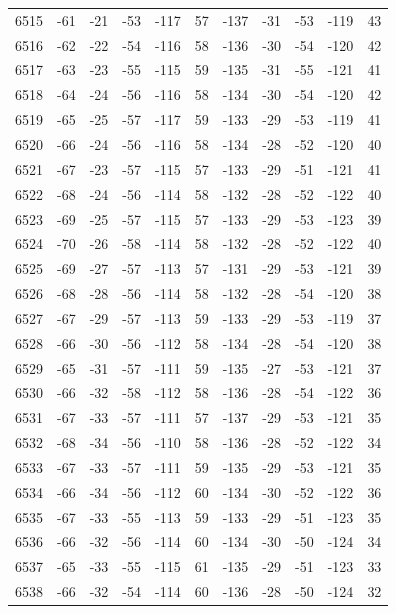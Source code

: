 \begin{table}[H]
\begin{tabular}{lllllllllll}
6515 & -61 & -21 & -53 & -117 & 57 & -137 & -31 & -53 & -119 & 43 \\
6516 & -62 & -22 & -54 & -116 & 58 & -136 & -30 & -54 & -120 & 42 \\
6517 & -63 & -23 & -55 & -115 & 59 & -135 & -31 & -55 & -121 & 41 \\
6518 & -64 & -24 & -56 & -116 & 58 & -134 & -30 & -54 & -120 & 42 \\
6519 & -65 & -25 & -57 & -117 & 59 & -133 & -29 & -53 & -119 & 41 \\
6520 & -66 & -24 & -56 & -116 & 58 & -134 & -28 & -52 & -120 & 40 \\
6521 & -67 & -23 & -57 & -115 & 57 & -133 & -29 & -51 & -121 & 41 \\
6522 & -68 & -24 & -56 & -114 & 58 & -132 & -28 & -52 & -122 & 40 \\
6523 & -69 & -25 & -57 & -115 & 57 & -133 & -29 & -53 & -123 & 39 \\
6524 & -70 & -26 & -58 & -114 & 58 & -132 & -28 & -52 & -122 & 40 \\
6525 & -69 & -27 & -57 & -113 & 57 & -131 & -29 & -53 & -121 & 39 \\
6526 & -68 & -28 & -56 & -114 & 58 & -132 & -28 & -54 & -120 & 38 \\
6527 & -67 & -29 & -57 & -113 & 59 & -133 & -29 & -53 & -119 & 37 \\
6528 & -66 & -30 & -56 & -112 & 58 & -134 & -28 & -54 & -120 & 38 \\
6529 & -65 & -31 & -57 & -111 & 59 & -135 & -27 & -53 & -121 & 37 \\
6530 & -66 & -32 & -58 & -112 & 58 & -136 & -28 & -54 & -122 & 36 \\
6531 & -67 & -33 & -57 & -111 & 57 & -137 & -29 & -53 & -121 & 35 \\
6532 & -68 & -34 & -56 & -110 & 58 & -136 & -28 & -52 & -122 & 34 \\
6533 & -67 & -33 & -57 & -111 & 59 & -135 & -29 & -53 & -121 & 35 \\
6534 & -66 & -34 & -56 & -112 & 60 & -134 & -30 & -52 & -122 & 36 \\
6535 & -67 & -33 & -55 & -113 & 59 & -133 & -29 & -51 & -123 & 35 \\
6536 & -66 & -32 & -56 & -114 & 60 & -134 & -30 & -50 & -124 & 34 \\
6537 & -65 & -33 & -55 & -115 & 61 & -135 & -29 & -51 & -123 & 33 \\
6538 & -66 & -32 & -54 & -114 & 60 & -136 & -28 & -50 & -124 & 32 \\

\end{tabular}
\end{table}
